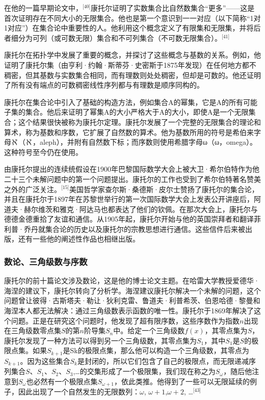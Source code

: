 在他的一篇早期论文中，\(^\text{[40]}\)康托尔证明了实数集合比自然数集合“更多”——这是首次证明存在不同大小的无限集合。他也是第一个意识到一一对应（以下简称“1对1对应”）在集合论中重要性的人。他利用这个概念定义了有限集和无限集，并将后者细分为可列（或可数无限）集合和不可列集合（不可数无限集合）。\(^\text{[41]}\)

康托尔在拓扑学中发展了重要的概念，并探讨了这些概念与基数的关系。例如，他证明了康托尔集（由亨利·约翰·斯蒂芬·史密斯于1875年发现）在任何地方都不稠密，但其基数与实数集合相同，而有理数则处处稠密，但却是可数的。他还证明了所有没有端点的可数稠密线性序列都与有理数是顺序同构的。

康托尔在集合论中引入了基础的构造方法，例如集合A的幂集，它是A的所有可能子集的集合。他后来证明了幂集A的大小严格大于A的大小，即使A是一个无限集合；这个结果很快被称为康托尔定理。康托尔发展了一个完整的无限集合的理论和算术，称为基数和序数，它扩展了自然数的算术。他为基数所用的符号是希伯来字母ℵ（ℵ，aleph），并附有自然数下标；而序数则使用希腊字母ω（ω，omega）。这种符号至今仍在使用。

由康托尔提出的连续统假设在1900年巴黎国际数学大会上被大卫·希尔伯特作为他二十三个未解问题中的第一个问题提出。康托尔的工作也受到了希尔伯特著名赞美之外的广泛关注。\(^\text{[15]}\)美国哲学家查尔斯·桑德斯·皮尔士赞扬了康托尔的集合论，并且在康托尔于1897年在苏黎世举行的第一次国际数学大会上发表公开讲座后，阿道夫·赫尔维茨和雅克·阿达马也都表达了他们的钦佩。在那次大会上，康托尔与德德金德重拾了友谊和通信。从1905年起，康托尔开始与他的英国崇拜者和翻译菲利普·乔丹就集合论的历史以及康托尔的宗教思想进行通信。这些信件后来被出版，还有一些他的阐述性作品也相继出版。
\subsubsection{数论、三角级数与序数}  
康托尔的前十篇论文涉及数论，这是他的博士论文主题。在哈雷大学教授爱德华·海涅的建议下，康托尔转向了分析学。海涅建议康托尔解决一个未解的问题，这个问题曾让彼得·古斯塔夫·勒让·狄利克雷、鲁道夫·利普希茨、伯恩哈德·黎曼和海涅本人都无法解决：通过三角级数表示函数的唯一性。康托尔于1869年解决了这个问题。正是在研究这个问题时，他发现了超有限序数，这些序数作为指数\(n\)出现在三角级数零点集\(S\)的第\(n\)阶导集\(S_n\)中。给定一个三角级数\(f(x)\)，其零点集为\(S\)，康托尔发现了一种方法可以得到另一个三角级数，其零点集为\(S_1\)，其中\(S_1\)是\(S\)的极限点集。如果\(S_{k+1}\)是Sk的极限点集，那么他可以构造一个三角级数，其零点为\(S_{k+1}\)。因为这些集合\(S_k\)是封闭的，所以它们包含了自己的极限点，而无限递减序列集合\(S\)、\(S_1\)、\(S_2\)、\(S_3\),…的交集形成了一个极限集，我们现在称之为\(S_\omega\)，随后他注意到\(S_\omega\)也必然有一个极限点集\(S_{\omega+1}\)，依此类推。他得到了一些可以无限延续的例子，因此出现了一个自然发生的无限数列：\(\omega\), \(\omega+1\),\(\omega+2\), …\(^\text{[43]}\)

